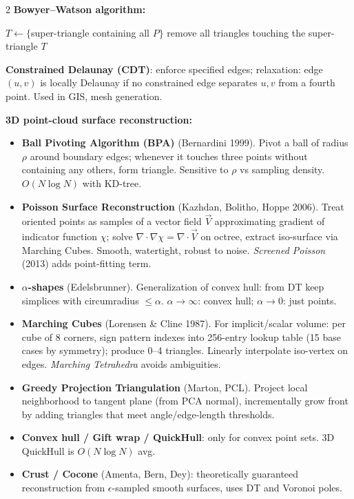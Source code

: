 \begin{paracol}{2}
\textbf{Bowyer–Watson algorithm:}

\begin{algorithm}[H]
\scriptsize
\SetAlgoLined
{}
$T \leftarrow \{$super-triangle containing all $P\}$\;
remove all triangles touching the super-triangle\;
\Return $T$\;
\caption{Bowyer–Watson Delaunay}
\end{algorithm}

\textbf{Constrained Delaunay (CDT)}: enforce specified edges; relaxation: edge $(u,v)$ is locally Delaunay if no constrained edge separates $u,v$ from a fourth point. Used in GIS, mesh generation.

\textbf{3D point-cloud surface reconstruction:}
\begin{itemize}[leftmargin=*,nosep]
  \item \textbf{Ball Pivoting Algorithm (BPA)} (Bernardini 1999). Pivot a ball of radius $\rho$ around boundary edges; whenever it touches three points without containing any others, form triangle. Sensitive to $\rho$ vs sampling density. $O(N\log N)$ with KD-tree.
  \item \textbf{Poisson Surface Reconstruction} (Kazhdan, Bolitho, Hoppe 2006). Treat oriented points as samples of a vector field $\vec V$ approximating gradient of indicator function $\chi$; solve $\nabla\!\cdot\!\nabla\chi=\nabla\!\cdot\!\vec V$ on octree, extract iso-surface via Marching Cubes. Smooth, watertight, robust to noise. \emph{Screened Poisson} (2013) adds point-fitting term.
  \item \textbf{$\alpha$-shapes} (Edelsbrunner). Generalization of convex hull: from DT keep simplices with circumradius $\le\alpha$. $\alpha\!\to\!\infty$: convex hull; $\alpha\!\to\!0$: just points.
  \item \textbf{Marching Cubes} (Lorensen \& Cline 1987). For implicit/scalar volume: per cube of 8 corners, sign pattern indexes into 256-entry lookup table (15 base cases by symmetry); produce 0–4 triangles. Linearly interpolate iso-vertex on edges. \emph{Marching Tetrahedra} avoids ambiguities.
  \item \textbf{Greedy Projection Triangulation} (Marton, PCL). Project local neighborhood to tangent plane (from PCA normal), incrementally grow front by adding triangles that meet angle/edge-length thresholds.
  \item \textbf{Convex hull / Gift wrap / QuickHull}: only for convex point sets. 3D QuickHull is $O(N\log N)$ avg.
  \item \textbf{Crust / Cocone} (Amenta, Bern, Dey): theoretically guaranteed reconstruction from $\epsilon$-sampled smooth surfaces, uses DT and Voronoi poles.
\end{itemize}


\end{paracol}
